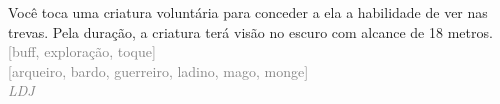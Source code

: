 \documentclass{RPG_Adventure}[2021/10/20]
\begin{document}
{\normalsize Você toca uma criatura voluntária para conceder a ela a habilidade de ver nas trevas. Pela duração, a criatura terá visão no escuro com alcance de 18 metros.\\}
{\scriptsize \textcolor{gray}{[buff, exploração, toque]\\}}
{\scriptsize \textcolor{gray}{[arqueiro, bardo, guerreiro, ladino, mago, monge]\\}}
{\tiny \textcolor{gray}{\textit{LDJ}}}\jump

\end{document}
